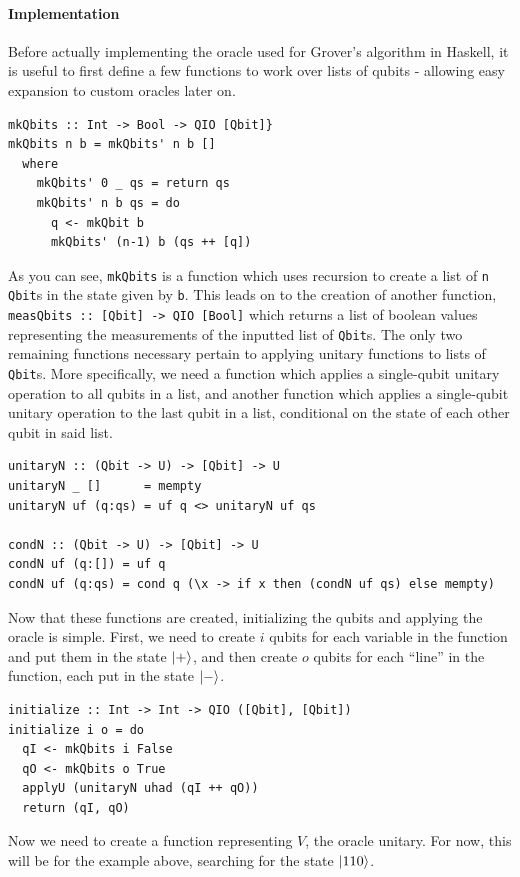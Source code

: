 \documentclass[a4paper,10pt, titlepage, twoside]{article}
\begin{document}
\paragraph{Implementation}
Before actually implementing the oracle used for Grover's algorithm in Haskell, it is useful to first define a few functions to work over lists of qubits - allowing easy expansion to custom oracles later on.
\begin{verbatim}
mkQbits :: Int -> Bool -> QIO [Qbit]}
mkQbits n b = mkQbits' n b []
  where
    mkQbits' 0 _ qs = return qs
    mkQbits' n b qs = do
      q <- mkQbit b
      mkQbits' (n-1) b (qs ++ [q])
\end{verbatim}

As you can see, \texttt{mkQbits} is a function which uses recursion to create a list of \texttt{n Qbit}s in the state given by \texttt{b}. This leads on to the creation of another function, \texttt{measQbits :: [Qbit] -> QIO [Bool]} which returns a list of boolean values representing the measurements of the inputted list of \texttt{Qbit}s. The only two remaining functions necessary pertain to applying unitary functions to lists of \texttt{Qbit}s. More specifically, we need a function which applies a single-qubit unitary operation to all qubits in a list, and another function which applies a single-qubit unitary operation to the last qubit in a list, conditional on the state of each other qubit in said list.
\begin{verbatim}
unitaryN :: (Qbit -> U) -> [Qbit] -> U
unitaryN _ []      = mempty
unitaryN uf (q:qs) = uf q <> unitaryN uf qs

condN :: (Qbit -> U) -> [Qbit] -> U
condN uf (q:[]) = uf q
condN uf (q:qs) = cond q (\x -> if x then (condN uf qs) else mempty)
\end{verbatim}

Now that these functions are created, initializing the qubits and applying the oracle is simple. First, we need to create $i$ qubits for each variable in the function and put them in the state $\ket +$, and then create $o$ qubits for each ``line'' in the function, each put in the state $\ket -$.

\begin{verbatim}
initialize :: Int -> Int -> QIO ([Qbit], [Qbit])
initialize i o = do
  qI <- mkQbits i False
  qO <- mkQbits o True
  applyU (unitaryN uhad (qI ++ qO))
  return (qI, qO)
\end{verbatim}

Now we need to create a function representing $V$, the oracle unitary. For now, this will be for the example above, searching for the state $\ket{110}$. 
\end{document}
